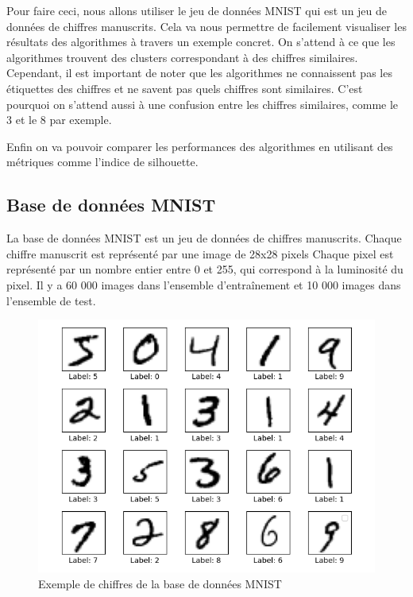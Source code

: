 \documentclass[french,a4paper,18pt]{article}
\begin{document}
Pour faire ceci, nous allons utiliser le jeu de données MNIST qui est un jeu de données de chiffres manuscrits.
Cela va nous permettre de facilement visualiser les résultats des algorithmes à travers un exemple concret.
On s'attend à ce que les algorithmes trouvent des clusters correspondant à des chiffres similaires. 
Cependant, il est important de noter que les algorithmes ne connaissent pas les étiquettes des chiffres et ne savent pas quels chiffres sont similaires.
C'est pourquoi on s'attend aussi à une confusion entre les chiffres similaires, comme le 3 et le 8 par exemple.

Enfin on va pouvoir comparer les performances des algorithmes en utilisant des métriques comme l'indice de silhouette.

\subsection{Base de données MNIST}
La base de données MNIST est un jeu de données de chiffres manuscrits. 
Chaque chiffre manuscrit est représenté par une image de 28x28 pixels 
Chaque pixel est représenté par un nombre entier entre 0 et 255, qui correspond à la luminosité du pixel.
Il y a 60 000 images dans l'ensemble d'entraînement et 10 000 images dans l'ensemble de test.

\begin{figure}[h!]
    \centering
    \includegraphics[scale=0.5]{../images/mnist_plot.png}
    \caption{Exemple de chiffres de la base de données MNIST}\label{fig:mnist}
\end{figure}
\end{document}
